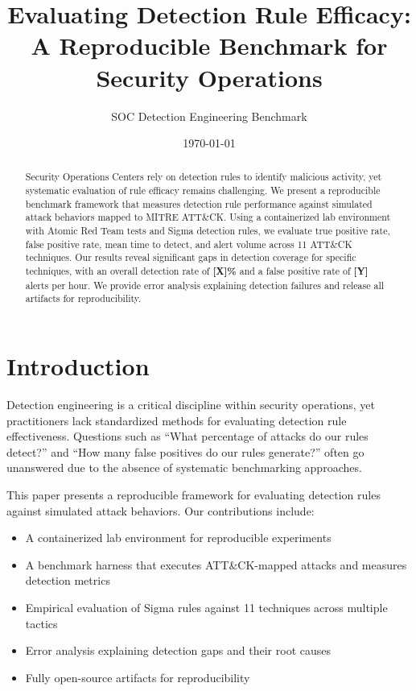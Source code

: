 \documentclass[11pt,a4paper]{article}
\title{Evaluating Detection Rule Efficacy: A Reproducible Benchmark for Security Operations}
\author{SOC Detection Engineering Benchmark}
\date{\today}
\begin{document}
\maketitle

\begin{abstract}
Security Operations Centers rely on detection rules to identify malicious activity, yet systematic evaluation of rule efficacy remains challenging. We present a reproducible benchmark framework that measures detection rule performance against simulated attack behaviors mapped to MITRE ATT\&CK. Using a containerized lab environment with Atomic Red Team tests and Sigma detection rules, we evaluate true positive rate, false positive rate, mean time to detect, and alert volume across 11 ATT\&CK techniques. Our results reveal significant gaps in detection coverage for specific techniques, with an overall detection rate of \textbf{[X]\%} and a false positive rate of \textbf{[Y]} alerts per hour. We provide error analysis explaining detection failures and release all artifacts for reproducibility.
\end{abstract}

\section{Introduction}

Detection engineering is a critical discipline within security operations, yet practitioners lack standardized methods for evaluating detection rule effectiveness. Questions such as ``What percentage of attacks do our rules detect?'' and ``How many false positives do our rules generate?'' often go unanswered due to the absence of systematic benchmarking approaches.

This paper presents a reproducible framework for evaluating detection rules against simulated attack behaviors. Our contributions include:

\begin{itemize}
    \item A containerized lab environment for reproducible experiments
    \item A benchmark harness that executes ATT\&CK-mapped attacks and measures detection metrics
    \item Empirical evaluation of Sigma rules against 11 techniques across multiple tactics
    \item Error analysis explaining detection gaps and their root causes
    \item Fully open-source artifacts for reproducibility
\end{itemize}
\end{document}
